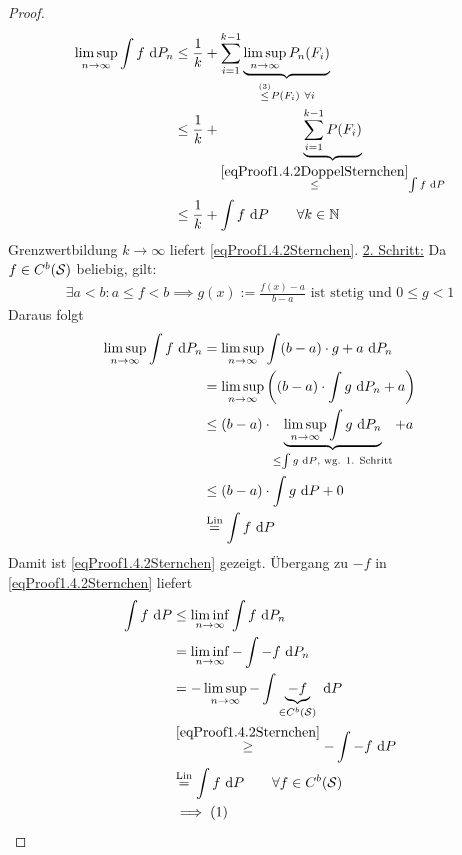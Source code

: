\begin{proof}
\begin{align*}
\limsup\limits_{n\to\infty}\int\limits f\d P_n
&\leq\frac{1}{k}+\sum\limits_{i=1}^{k-1}\underbrace{\limsup\limits_{n\to\infty} P_n(F_i)}_{\stackrel{(3)}{\leq}P(F_i)~\forall i}\\
&\leq\frac{1}{k}+\underbrace{\sum\limits_{i=1}^{k-1} P(F_i)}_{\stackrel{\eqref{eqProof1.4.2DoppelSternchen}}{\leq}\int\limits f\d P}\\
&\leq\frac{1}{k}+\int\limits f\d P\qquad\forall k\in\N
\end{align*}
Grenzwertbildung $k\to\infty$ liefert \eqref{eqProof1.4.2Sternchen}.\nl
\ul{2. Schritt:} Da $f\in C^b(\S)$ beliebig, gilt:
\begin{align*}
\exists a<b:a\leq f<b
\implies g(x):=\frac{f(x)-a}{b-a}\text{ ist stetig und } 0\leq g<1
\end{align*}
Daraus folgt
\begin{align*}
\limsup\limits_{n\to\infty}\int\limits f\d P_n
&=\limsup\limits_{n\to\infty}\int\limits (b-a)\cdot g+a\d P_n\\
&=\limsup\limits_{n\to\infty}\left((b-a)\cdot\int\limits g\d P_n+a\right)\\
&\leq(b-a)\cdot\underbrace{\limsup\limits_{n\to\infty}\int\limits g\d P_n}_{\leq\int\limits g\d P\text{, wg. 1. Schritt}}+a\\
&\leq(b-a)\cdot\int\limits g\d P+0\\
&\stackeq{\text{Lin}}
\int\limits f\d P
\end{align*}
Damit ist \eqref{eqProof1.4.2Sternchen} gezeigt. Übergang zu $-f$ in \eqref{eqProof1.4.2Sternchen} liefert
\begin{align*}
\int\limits f\d P
&\leq
\liminf\limits_{n\to\infty}\int\limits f\d P_n\\
&=\liminf\limits_{n\to\infty}-\int\limits -f\d P_n\\
&=-\limsup\limits_{n\to\infty}-\int\limits \underbrace{-f}_{\in C^b(\S)}\d P\\
&\stackrel{\eqref{eqProof1.4.2Sternchen}}{\geq}
-\int\limits -f\d P\\
&\stackeq{\text{Lin}}
\int\limits f\d P
\qquad\forall f\in C^b(\S)\\
&\implies(1)
\end{align*}


\end{proof}
